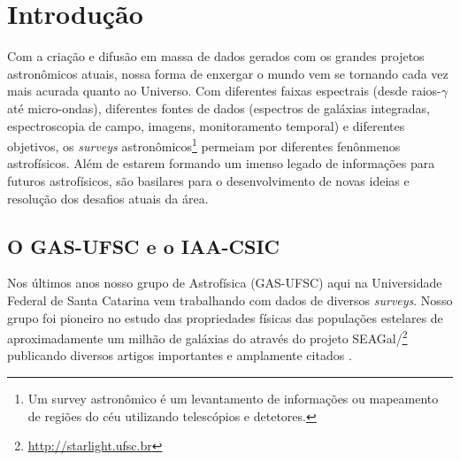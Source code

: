 


\chapter{Introdução}
\label{sec:intro}

Com a criação e difusão em massa de dados gerados com os grandes projetos astronômicos atuais, nossa
forma de enxergar o mundo vem se tornando cada vez mais acurada quanto ao Universo. Com diferentes
faixas espectrais (desde raios-$\gamma$ até micro-ondas), diferentes fontes de dados (espectros de
galáxias integradas, espectroscopia de campo, imagens, monitoramento temporal) e diferentes
objetivos, os {\em surveys} astronômicos\footnote{Um survey astronômico é um levantamento de
informações ou mapeamento de regiões do céu utilizando telescópios e detetores.} permeiam por
diferentes fenônmenos astrofísicos. Além de estarem formando um imenso legado de informações para
futuros astrofísicos, são basilares para o desenvolvimento de novas ideias e resolução dos desafios
atuais da área.
 
\section{O GAS-UFSC e o IAA-CSIC}
\label{sec:intro:UFSCeIAA}

Nos últimos anos nosso grupo de Astrofísica (GAS-UFSC) aqui na Universidade Federal de Santa
Catarina vem trabalhando com dados de diversos {\em surveys}. Nosso grupo foi pioneiro no estudo das
propriedades físicas das populações estelares de aproximadamente um milhão de galáxias do \SDSS
através do projeto
SEAGal/\starlight\footnote{\href{http://starlight.ufsc.br}{http://starlight.ufsc.br}} publicando
diversos artigos importantes e amplamente citados \citep[e.g., ][]{CidFernandes.etal.2005a,
Mateus.etal.2006a, Stasinska.etal.2006a, Asari.etal.2007a, Stasinska.etal.2008a,
CidFernandes.etal.2011a}.

